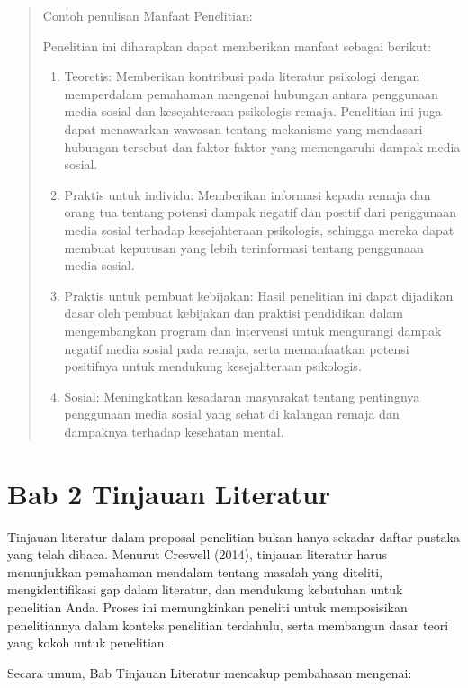 \documentclass[
  indonesian,
  letterpaper,
]{scrbook}
\providecommand{\tightlist}{%
  \setlength{\itemsep}{0pt}\setlength{\parskip}{0pt}}
\begin{document}
\begin{quote}
Contoh penulisan Manfaat Penelitian:

Penelitian ini diharapkan dapat memberikan manfaat sebagai berikut:

\begin{enumerate}
\def\labelenumi{\arabic{enumi}.}
\tightlist
\item
  Teoretis: Memberikan kontribusi pada literatur psikologi dengan
  memperdalam pemahaman mengenai hubungan antara penggunaan media sosial
  dan kesejahteraan psikologis remaja. Penelitian ini juga dapat
  menawarkan wawasan tentang mekanisme yang mendasari hubungan tersebut
  dan faktor-faktor yang memengaruhi dampak media sosial.
\item
  Praktis untuk individu: Memberikan informasi kepada remaja dan orang
  tua tentang potensi dampak negatif dan positif dari penggunaan media
  sosial terhadap kesejahteraan psikologis, sehingga mereka dapat
  membuat keputusan yang lebih terinformasi tentang penggunaan media
  sosial.
\item
  Praktis untuk pembuat kebijakan: Hasil penelitian ini dapat dijadikan
  dasar oleh pembuat kebijakan dan praktisi pendidikan dalam
  mengembangkan program dan intervensi untuk mengurangi dampak negatif
  media sosial pada remaja, serta memanfaatkan potensi positifnya untuk
  mendukung kesejahteraan psikologis.
\item
  Sosial: Meningkatkan kesadaran masyarakat tentang pentingnya
  penggunaan media sosial yang sehat di kalangan remaja dan dampaknya
  terhadap kesehatan mental.
\end{enumerate}
\end{quote}

\section{Bab 2 Tinjauan Literatur}\label{bab-2-tinjauan-literatur}

Tinjauan literatur dalam proposal penelitian bukan hanya sekadar daftar
pustaka yang telah dibaca. Menurut Creswell (2014), tinjauan literatur
harus menunjukkan pemahaman mendalam tentang masalah yang diteliti,
mengidentifikasi gap dalam literatur, dan mendukung kebutuhan untuk
penelitian Anda. Proses ini memungkinkan peneliti untuk memposisikan
penelitiannya dalam konteks penelitian terdahulu, serta membangun dasar
teori yang kokoh untuk penelitian.

Secara umum, Bab Tinjauan Literatur mencakup pembahasan mengenai:
\end{document}
